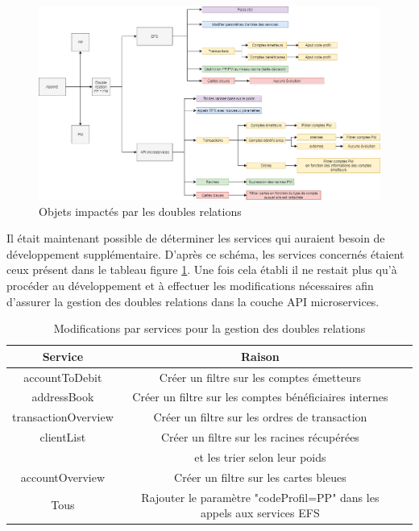 \begin{figure}[h!]
	\includegraphics[scale=0.45]{images/travailNeuflizeOBC/doubleRelation/doubleRelation.png}
	\centering
	\caption{Objets impactés par les doubles relations}
	\label{doubleRelation}
\end{figure}

	Il était maintenant possible de déterminer les services qui auraient besoin de développement supplémentaire. D'après ce schéma, les services concernés étaient ceux présent dans le tableau figure \ref{servicesDoubleRelation}. Une fois cela établi il ne restait plus qu'à procéder au développement et à effectuer les modifications nécessaires afin d'assurer la gestion des doubles relations dans la couche API microservices. \\ 
	
\begin{table}[h!]
	\center
	\begin{tabular}{| c | c | c |}
     \hline
     Service & Raison \\ \hline
     accountToDebit & Créer un filtre sur les comptes émetteurs \\ \hline
     addressBook & Créer un filtre sur les comptes bénéficiaires internes \\ \hline
     transactionOverview & Créer un filtre sur les ordres de transaction\\ \hline
     clientList & Créer un filtre sur les racines récupérées \\ & et les trier selon leur poids\\ \hline
     accountOverview & Créer un filtre sur les cartes bleues \\
     Tous & Rajouter le paramètre "codeProfil=PP" dans les appels aux services EFS \\ 
     \hline
	\end{tabular}
	\caption{Modifications par services pour la gestion des doubles relations}
	\label{servicesDoubleRelation}
\end{table}

